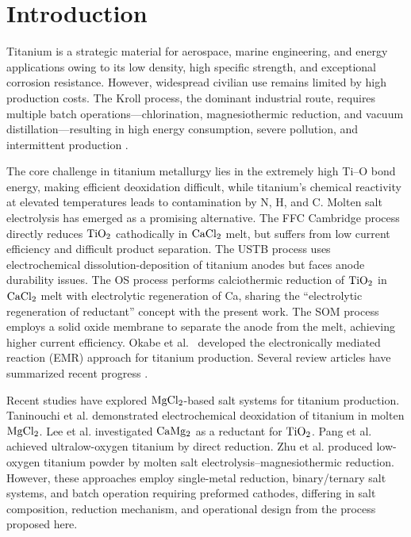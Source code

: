 \documentclass[sn-mathphys,Numbered]{sn-jnl}
\begin{document}
\maketitle

\section{Introduction}

Titanium is a strategic material for aerospace, marine engineering, and energy applications owing to its low density, high specific strength, and exceptional corrosion resistance. However, widespread civilian use remains limited by high production costs. The Kroll process, the dominant industrial route, requires multiple batch operations---chlorination, magnesiothermic reduction, and vacuum distillation---resulting in high energy consumption, severe pollution, and intermittent production \cite{kroll1937,ji2026}.

The core challenge in titanium metallurgy lies in the extremely high Ti--O bond energy, making efficient deoxidation difficult, while titanium's chemical reactivity at elevated temperatures leads to contamination by N, H, and C. Molten salt electrolysis has emerged as a promising alternative. The FFC Cambridge process \cite{fray2000} directly reduces $\ce{TiO2}$ cathodically in $\ce{CaCl2}$ melt, but suffers from low current efficiency and difficult product separation. The USTB process \cite{jiao2023} uses electrochemical dissolution-deposition of titanium anodes but faces anode durability issues. The OS process \cite{ono2002} performs calciothermic reduction of $\ce{TiO2}$ in $\ce{CaCl2}$ melt with electrolytic regeneration of Ca, sharing the ``electrolytic regeneration of reductant'' concept with the present work. The SOM process \cite{pal2001} employs a solid oxide membrane to separate the anode from the melt, achieving higher current efficiency. Okabe et al.\ \cite{okabe1997} developed the electronically mediated reaction (EMR) approach for titanium production. Several review articles have summarized recent progress \cite{zhang2024,ji2026}.

Recent studies have explored $\ce{MgCl2}$-based salt systems for titanium production. Taninouchi et al. \cite{taninouchi2016} demonstrated electrochemical deoxidation of titanium in molten $\ce{MgCl2}$. Lee et al. \cite{lee2025} investigated $\ce{CaMg2}$ as a reductant for $\ce{TiO2}$. Pang et al. \cite{pang2024} achieved ultralow-oxygen titanium by direct reduction. Zhu et al. \cite{xu2025} produced low-oxygen titanium powder by molten salt electrolysis--magnesiothermic reduction. However, these approaches employ single-metal reduction, binary/ternary salt systems, and batch operation requiring preformed cathodes, differing in salt composition, reduction mechanism, and operational design from the process proposed here.
\end{document}
